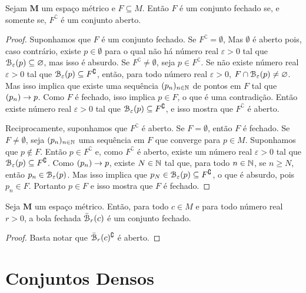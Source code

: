 \begin{prop}
Sejam $\bm M$ um espaço métrico e $F \subseteq M$. Então $F$ é um conjunto fechado se, e somente se, $F^\complement$ é um conjunto aberto.
\end{prop}
\begin{proof}
Suponhamos que $F$ é um conjunto fechado. Se $F^\complement = \emptyset$, Mas $\emptyset$ é aberto pois, caso contrário, existe $p \in \emptyset$ para o qual não há número real $\varepsilon > 0$ tal que $\mathcal{B}_\varepsilon(p) \subseteq \varnothing$, mas isso é absurdo. Se $F^\complement \neq \emptyset$, seja $p \in F^\complement$. Se não existe número real $\varepsilon > 0$ tal que $\mathcal{B}_\varepsilon(p) \subseteq F^\complement$, então, para todo número real $\varepsilon > 0$, $F \cap \mathcal{B}_\varepsilon(p) \neq \varnothing$. Mas isso implica que existe uma sequência $(p_n)_{n \in \mathbb{N}}$ de pontos em $F$ tal que $(p_n) \rightarrow p$. Como $F$ é fechado, isso implica $p \in F$, o que é uma contradição. Então existe número real $\varepsilon > 0$ tal que $\mathcal{B}_\varepsilon(p) \subseteq F^\complement$, e isso mostra que $F^\complement$ é aberto.
	
Reciprocamente, suponhamos que $F^\complement$ é aberto. Se $F = \emptyset$, então $F$ é fechado. Se $F \neq \emptyset$, seja $(p_n)_{n \in \mathbb{N}}$ uma sequência em $F$ que converge para $p \in M$. Suponhamos que $p \notin F$. Então $p \in F^\complement$ e, como $F^\complement$ é aberto, existe um número real $\varepsilon > 0$ tal que $\mathcal{B}_\varepsilon(p) \subseteq F^\complement$. Como $(p_n) \rightarrow p$, existe $N \in \mathbb{N}$ tal que, para todo $n \in \mathbb{N}$, se $n \geq N$, então $p_n \in \mathcal{B}_\varepsilon(p)$. Mas isso implica que $p_N \in \mathcal{B}_\varepsilon(p) \subseteq F^\complement$, o que é absurdo, pois $p_n \in F$. Portanto $p \in F$ e isso mostra que $F$ é fechado.
\end{proof}

\begin{prop}
Seja $\bm M$ um espaço métrico. Então, para todo $c \in M$ e para todo número real $r > 0$, a bola fechada $\bar{\mathcal{B}}_r(c)$ é um conjunto fechado.
\end{prop}
\begin{proof}
Basta notar que $\bar{\mathcal{B}}_r(c)^\complement$ é aberto.
\end{proof}

\section{Conjuntos Densos}

